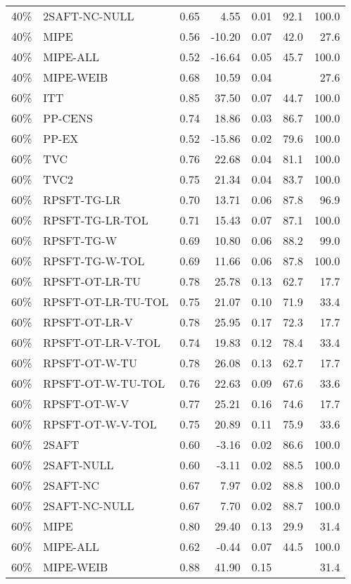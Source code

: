 \begin{table}[ht]
{\begin{tabular}{llrrrrr}
  40\% & 2SAFT-NC-NULL & 0.65 & 4.55 & 0.01 & 92.1 & 100.0 \\ 
  40\% & MIPE & 0.56 & -10.20 & 0.07 & 42.0 & 27.6 \\ 
  40\% & MIPE-ALL & 0.52 & -16.64 & 0.05 & 45.7 & 100.0 \\ 
  40\% & MIPE-WEIB & 0.68 & 10.59 & 0.04 &  & 27.6 \\ 
   \hline
60\% & ITT & 0.85 & 37.50 & 0.07 & 44.7 & 100.0 \\ 
  60\% & PP-CENS & 0.74 & 18.86 & 0.03 & 86.7 & 100.0 \\ 
  60\% & PP-EX & 0.52 & -15.86 & 0.02 & 79.6 & 100.0 \\ 
  60\% & TVC & 0.76 & 22.68 & 0.04 & 81.1 & 100.0 \\ 
  60\% & TVC2 & 0.75 & 21.34 & 0.04 & 83.7 & 100.0 \\ 
   \hline
60\% & RPSFT-TG-LR & 0.70 & 13.71 & 0.06 & 87.8 & 96.9 \\ 
  60\% & RPSFT-TG-LR-TOL & 0.71 & 15.43 & 0.07 & 87.1 & 100.0 \\ 
  60\% & RPSFT-TG-W & 0.69 & 10.80 & 0.06 & 88.2 & 99.0 \\ 
  60\% & RPSFT-TG-W-TOL & 0.69 & 11.66 & 0.06 & 87.8 & 100.0 \\ 
  60\% & RPSFT-OT-LR-TU & 0.78 & 25.78 & 0.13 & 62.7 & 17.7 \\ 
  60\% & RPSFT-OT-LR-TU-TOL & 0.75 & 21.07 & 0.10 & 71.9 & 33.4 \\ 
  60\% & RPSFT-OT-LR-V & 0.78 & 25.95 & 0.17 & 72.3 & 17.7 \\ 
  60\% & RPSFT-OT-LR-V-TOL & 0.74 & 19.83 & 0.12 & 78.4 & 33.4 \\ 
   \hline
60\% & RPSFT-OT-W-TU & 0.78 & 26.08 & 0.13 & 62.7 & 17.7 \\ 
  60\% & RPSFT-OT-W-TU-TOL & 0.76 & 22.63 & 0.09 & 67.6 & 33.6 \\ 
  60\% & RPSFT-OT-W-V & 0.77 & 25.21 & 0.16 & 74.6 & 17.7 \\ 
  60\% & RPSFT-OT-W-V-TOL & 0.75 & 20.89 & 0.11 & 75.9 & 33.6 \\ 
   \hline
60\% & 2SAFT & 0.60 & -3.16 & 0.02 & 86.6 & 100.0 \\ 
  60\% & 2SAFT-NULL & 0.60 & -3.11 & 0.02 & 88.5 & 100.0 \\ 
  60\% & 2SAFT-NC & 0.67 & 7.97 & 0.02 & 88.8 & 100.0 \\ 
  60\% & 2SAFT-NC-NULL & 0.67 & 7.70 & 0.02 & 88.7 & 100.0 \\ 
  60\% & MIPE & 0.80 & 29.40 & 0.13 & 29.9 & 31.4 \\ 
  60\% & MIPE-ALL & 0.62 & -0.44 & 0.07 & 44.5 & 100.0 \\ 
  60\% & MIPE-WEIB & 0.88 & 41.90 & 0.15 &  & 31.4 \\ 
   \hline
\end{tabular}
}
\end{table}
